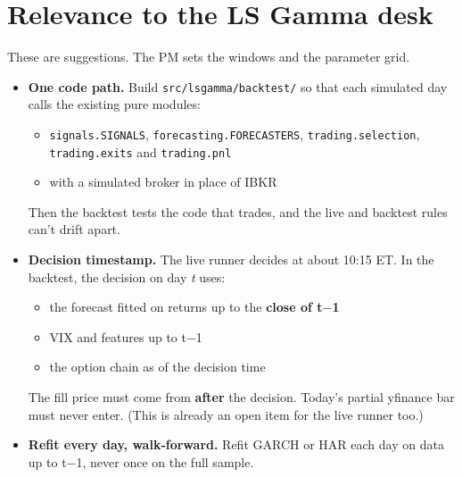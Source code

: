 \documentclass{article}
\begin{document}
\section{Relevance to the LS Gamma desk}

These are suggestions. The PM sets the windows and the parameter grid.

\begin{itemize}

\item \textbf{One code path.} Build \texttt{src/\allowbreak{}lsgamma/\allowbreak{}backtest/\allowbreak{}} so that each simulated day calls the existing pure modules:

\begin{itemize}

\item \texttt{signals.\allowbreak{}SIGNALS}, \texttt{forecasting.\allowbreak{}FORECASTERS}, \texttt{trading.\allowbreak{}selection}, \texttt{trading.\allowbreak{}exits} and \texttt{trading.\allowbreak{}pnl}

\item with a simulated broker in place of IBKR

\end{itemize}

Then the backtest tests the code that trades, and the live and backtest rules can't drift apart.

\item \textbf{Decision timestamp.} The live runner decides at about 10:15 ET. In the backtest, the decision on day \emph{t} uses:

\begin{itemize}

\item the forecast fitted on returns up to the \textbf{close of t\ensuremath{-}1}

\item VIX and features up to t\ensuremath{-}1

\item the option chain as of the decision time

\end{itemize}

The fill price must come from \textbf{after} the decision. Today's partial yfinance bar must never enter. (This is already an open item for the live runner too.)

\item \textbf{Refit every day, walk-forward.} Refit GARCH or HAR each day on data up to t\ensuremath{-}1, never once on the full sample.


\end{itemize}
\end{document}
